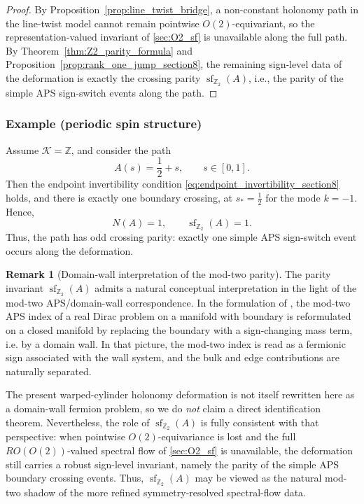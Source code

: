 \documentclass[11pt]{article}
\theoremstyle{definition}
\newtheorem{remark}[remark]{Remark}
\numberwithin{equation}{section}
\begin{document}
\begin{proof}
By Proposition~\ref{prop:line_twist_bridge}, a non-constant holonomy path in the line-twist
model cannot remain pointwise \(O(2)\)-equivariant, so the representation-valued invariant
of \autoref{sec:O2_sf} is unavailable along the full path. By Theorem~\ref{thm:Z2_parity_formula} and Proposition~\ref{prop:rank_one_jump_section8}, the remaining sign-level data of the deformation is exactly the crossing parity
\(\operatorname{sf}_{\mathbb Z_2}(A)\), i.e., the parity of the simple APS
sign-switch events along the path.
\end{proof}

\subsubsection*{Example (periodic spin structure)}
Assume \(\mathcal K=\mathbb Z\), and consider the path
\begin{equation}\label{eq:OT_example_path_section8}
A(s)=\frac12+s,
\qquad
s\in[0,1].
\end{equation}
Then the endpoint invertibility condition
\eqref{eq:endpoint_invertibility_section8} holds, and there is exactly one boundary crossing, at \(s_*=\tfrac12\) for the mode \(k=-1\). Hence,
\begin{equation}\label{eq:OT_example_values_section8}
N(A)=1,
\qquad
\operatorname{sf}_{\mathbb Z_2}(A)=1.
\end{equation}
Thus, the path has odd crossing parity: exactly one simple APS sign-switch event
occurs along the deformation.

\begin{remark}[Domain-wall interpretation of the mod-two parity]
\label{rem:domain_wall_mod2_bridge}
The parity invariant \(\operatorname{sf}_{\mathbb Z_2}(A)\) admits a natural
conceptual interpretation in the light of the mod-two APS/domain-wall
correspondence. In the formulation of
\cite{FukayaFurutaMatsukiMatsuoOnogiYamaguchiYamashita2022}, the mod-two APS index of a real Dirac problem on a manifold with boundary is reformulated on a
closed manifold by replacing the boundary with a sign-changing mass term, i.e.
by a domain wall. In that picture, the mod-two index is read as a fermionic sign
associated with the wall system, and the bulk and edge contributions are
naturally separated.

The present warped-cylinder holonomy deformation is not itself rewritten here as
a domain-wall fermion problem, so we do \emph{not} claim a direct identification
theorem. Nevertheless, the role of
\(\operatorname{sf}_{\mathbb Z_2}(A)\) is fully consistent with that
perspective: when pointwise \(O(2)\)-equivariance is lost and the full
\(RO(O(2))\)-valued spectral flow of \autoref{sec:O2_sf} is unavailable, the deformation still carries a robust sign-level invariant, namely the parity
of the simple APS boundary crossing events. Thus, \(\operatorname{sf}_{\mathbb Z_2}(A)\) may
be viewed as the natural mod-two shadow of the more refined symmetry-resolved
spectral-flow data.
\end{remark}
\end{document}
